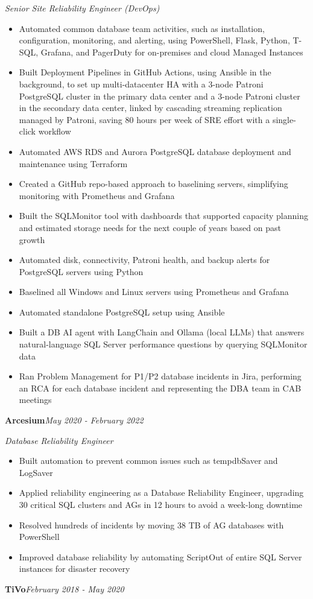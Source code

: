 \documentclass[10pt,a4paper]{article}
\begin{document}
\textit{Senior Site Reliability Engineer (DevOps)}\\[-5pt]
\begin{itemize}
  \item Automated common database team activities, such as installation, configuration, monitoring, and alerting, using PowerShell, Flask, Python, T-SQL, Grafana, and PagerDuty for on-premises and cloud Managed Instances
  \item Built Deployment Pipelines in GitHub Actions, using Ansible in the background, to set up multi-datacenter HA with a 3-node Patroni PostgreSQL cluster in the primary data center and a 3-node Patroni cluster in the secondary data center, linked by cascading streaming replication managed by Patroni, saving 80 hours per week of SRE effort with a single-click workflow
  \item Automated AWS RDS and Aurora PostgreSQL database deployment and maintenance using Terraform
  \item Created a GitHub repo-based approach to baselining servers, simplifying monitoring with Prometheus and Grafana
  \item Built the SQLMonitor tool with dashboards that supported capacity planning and estimated storage needs for the next couple of years based on past growth
  \item Automated disk, connectivity, Patroni health, and backup alerts for PostgreSQL servers using Python
  \item Baselined all Windows and Linux servers using Prometheus and Grafana
  \item Automated standalone PostgreSQL setup using Ansible
  \item Built a DB AI agent with LangChain and Ollama (local LLMs) that answers natural-language SQL Server performance questions by querying SQLMonitor data
  \item Ran Problem Management for P1/P2 database incidents in Jira, performing an RCA for each database incident and representing the DBA team in CAB meetings
\end{itemize}
\vspace{14.7pt}
\noindent\textbf{Arcesium}\hfill \textit{May 2020 - February 2022}

\textit{Database Reliability Engineer}\\[-5pt]
\begin{itemize}
  \item Built automation to prevent common issues such as tempdbSaver and LogSaver
  \item Applied reliability engineering as a Database Reliability Engineer, upgrading 30 critical SQL clusters and AGs in 12 hours to avoid a week-long downtime
  \item Resolved hundreds of incidents by moving 38 TB of AG databases with PowerShell
  \item Improved database reliability by automating ScriptOut of entire SQL Server instances for disaster recovery
\end{itemize}
\vspace{14.7pt}
\noindent\textbf{TiVo}\hfill \textit{February 2018 - May 2020}
\end{document}
